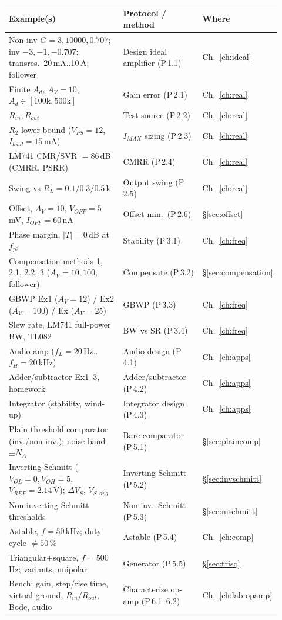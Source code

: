\documentclass[11pt,a4paper,oneside]{book}
\newcommand{\Ad}{A_d}
\begin{document}
\begin{longtable}{@{}p{0.46\linewidth}p{0.30\linewidth}p{0.16\linewidth}@{}}
\toprule
\textbf{Example(s)} & \textbf{Protocol / method} & \textbf{Where}\\
\midrule\endhead
Non-inv $G=3,10000,0.707$; inv $-3,-1,-0.707$; transres.\ 20\,mA..10\,A; follower
 & Design ideal amplifier (P\,1.1) & Ch.~\ref{ch:ideal}\\
Finite $\Ad$, $A_V=10$, $\Ad\in[100\text{k},500\text{k}]$ & Gain error (P\,2.1) & Ch.~\ref{ch:real}\\
$R_{in},R_{out}$ & Test-source (P\,2.2) & Ch.~\ref{ch:real}\\
$R_2$ lower bound ($V_{PS}=12$, $I_{load}=15$\,mA) & $I_{MAX}$ sizing (P\,2.3) & Ch.~\ref{ch:real}\\
LM741 CMR/SVR $=86$\,dB (CMRR, PSRR) & CMRR (P\,2.4) & Ch.~\ref{ch:real}\\
Swing vs $R_L=0.1/0.3/0.5$\,k & Output swing (P\,2.5) & Ch.~\ref{ch:real}\\
Offset, $A_V=10$, $V_{\!OFF}=5$\,mV, $I_{\!OFF}=60$\,nA & Offset min.\ (P\,2.6) & \S\ref{sec:offset}\\
Phase margin, $|T|=0$\,dB at $f_{p2}$ & Stability (P\,3.1) & Ch.~\ref{ch:freq}\\
Compensation methods 1, 2.1, 2.2, 3 ($A_V=10,100$, follower) & Compensate (P\,3.2) & \S\ref{sec:compensation}\\
GBWP Ex1 ($A_V=12$) / Ex2 ($A_V=100$) / Ex ($A_V=25$) & GBWP (P\,3.3) & Ch.~\ref{ch:freq}\\
Slew rate, LM741 full-power BW, TL082 & BW vs SR (P\,3.4) & Ch.~\ref{ch:freq}\\
Audio amp ($f_L=20$\,Hz..$f_H=20$\,kHz) & Audio design (P\,4.1) & Ch.~\ref{ch:apps}\\
Adder/subtractor Ex1--3, homework & Adder/subtractor (P\,4.2) & Ch.~\ref{ch:apps}\\
Integrator (stability, wind-up) & Integrator design (P\,4.3) & Ch.~\ref{ch:apps}\\
Plain threshold comparator (inv./non-inv.); noise band $\pm N_A$ & Bare comparator (P\,5.1) & \S\ref{sec:plaincomp}\\
Inverting Schmitt ($V_{OL}=0,V_{OH}=5$, $V_{REF}=2.14$\,V); $\Delta V_S$, $V_{S,avg}$ & Inverting Schmitt (P\,5.2) & \S\ref{sec:invschmitt}\\
Non-inverting Schmitt thresholds & Non-inv.\ Schmitt (P\,5.3) & \S\ref{sec:nischmitt}\\
Astable, $f=50$\,kHz; duty cycle $\neq50\,\%$ & Astable (P\,5.4) & Ch.~\ref{ch:comp}\\
Triangular+square, $f=500$\,Hz; variants, unipolar & Generator (P\,5.5) & \S\ref{sec:trisq}\\
Bench: gain, step/rise time, virtual ground, $R_{in}/R_{out}$, Bode, audio & Characterise op-amp (P\,6.1--6.2) & Ch.~\ref{ch:lab-opamp}\\
\bottomrule
\end{longtable}
\end{document}
